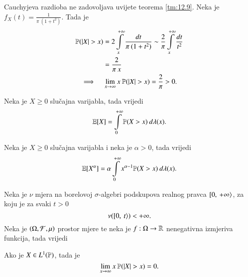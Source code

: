 \begin{pr}  \label{pr:12.11}
    Cauchyjeva razdioba ne zadovoljava uvijete teorema \ref{tm:12.9}.
    Neka je $f_X (t) = \frac{1}{\pi \: (1 + t^2)}$.
    Tada je
    \begin{equation*}
        \begin{gathered}
            \begin{aligned}
                \mathbb{P}({|X| > x}) &= 2 \int\limits_x^{+\infty} \frac{dt}{\pi \: (1 + t^2)} \sim \frac{2}{\pi} \int\limits_x^{+\infty} \frac{dt}{t^2}\\
                &= \frac{2}{\pi \: x}
            \end{aligned}\\
            \implies \quad \lim\limits_{x \to \infty} x \: \mathbb{P}({|X| > x}) = \frac{2}{\pi} > 0.
        \end{gathered}
    \end{equation*}
\end{pr}

\begin{lm}  \label{lm:12.11-1}
    Neka je $X \geq 0$ slu\v cajna varijabla, tada vrijedi
    \begin{equation*}
        \mathbb{E} [X] = \int\limits_{0}^{+\infty} \mathbb{P} (X > x) \: d \lambda (x).
    \end{equation*}
\end{lm}

\begin{lm}  \label{lm:12.11-2}
    Neka je $X \geq 0$ slu\v cajna varijabla i neka je $\alpha > 0$, tada vrijedi
    \begin{equation*}
        \mathbb{E} [X^\alpha] = \alpha \int\limits_{0}^{+\infty} x^{\alpha - 1} \mathbb{P} (X > x) \: d \lambda (x).
    \end{equation*}
\end{lm}

\begin{tm}  \label{tm:12.11-1}
    Neka je $\nu$ mjera na borelovoj $\sigma$-algebri podskupova realnog pravca $[ {0}, \: {+\infty} \rangle$, za koju je za svaki $t > 0$
    \begin{equation*}
        \nu ([ {0}, \: {t} \rangle) < +\infty.
    \end{equation*}
    Neka je $(\Omega, \mathcal{F}, \mu)$ prostor mjere te neka je $f: \Omega \to \mathbb{R}$ nenegativna izmjeriva funkcija, tada vrijedi

\end{tm}

\begin{zad} \label{zad:12.12}
    Ako je $X \in L^1(\mathbb{P})$, tada je
    \begin{equation*}
        \lim\limits_{x \to \infty} x \: \mathbb{P}({|X| > x}) = 0.
    \end{equation*}
\end{zad}

